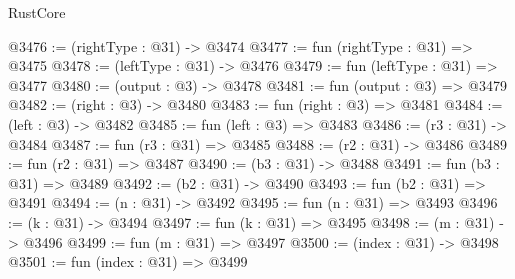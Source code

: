 \begin{lexlean}{RustCore}
\begin{coremodule}
@3476 := (rightType : @31) -> @3474
@3477 := fun (rightType : @31) => @3475
@3478 := (leftType : @31) -> @3476
@3479 := fun (leftType : @31) => @3477
@3480 := (output : @3) -> @3478
@3481 := fun (output : @3) => @3479
@3482 := (right : @3) -> @3480
@3483 := fun (right : @3) => @3481
@3484 := (left : @3) -> @3482
@3485 := fun (left : @3) => @3483
@3486 := (r3 : @31) -> @3484
@3487 := fun (r3 : @31) => @3485
@3488 := (r2 : @31) -> @3486
@3489 := fun (r2 : @31) => @3487
@3490 := (b3 : @31) -> @3488
@3491 := fun (b3 : @31) => @3489
@3492 := (b2 : @31) -> @3490
@3493 := fun (b2 : @31) => @3491
@3494 := (n : @31) -> @3492
@3495 := fun (n : @31) => @3493
@3496 := (k : @31) -> @3494
@3497 := fun (k : @31) => @3495
@3498 := (m : @31) -> @3496
@3499 := fun (m : @31) => @3497
@3500 := (index : @31) -> @3498
@3501 := fun (index : @31) => @3499
\end{coremodule}
\end{lexlean}
